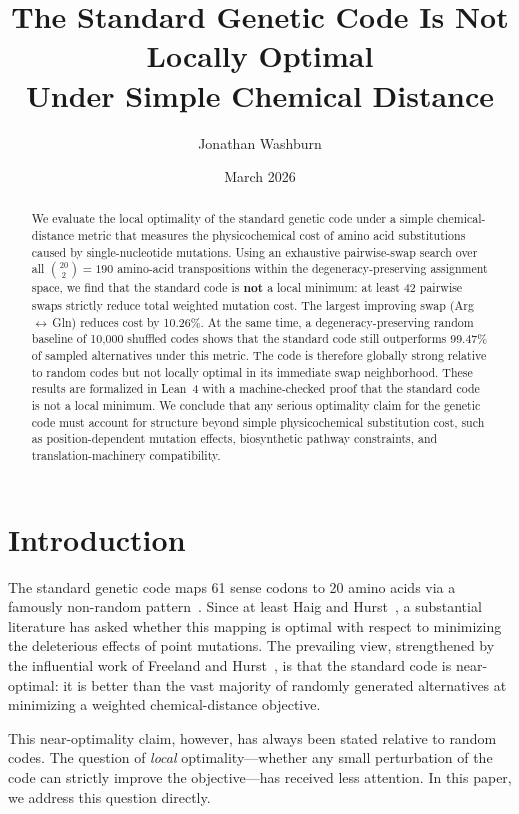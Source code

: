 \documentclass[11pt,twocolumn]{article}
\title{The Standard Genetic Code Is Not Locally Optimal\\Under Simple Chemical Distance}
\author[1]{Jonathan Washburn}
\affil[1]{Independent Researcher}
\date{March 2026}
\begin{document}
\maketitle

\begin{abstract}
We evaluate the local optimality of the standard genetic code under a
simple chemical-distance metric that measures the physicochemical cost of
amino acid substitutions caused by single-nucleotide mutations. Using an
exhaustive pairwise-swap search over all $\binom{20}{2} = 190$ amino-acid
transpositions within the degeneracy-preserving assignment space, we find
that the standard code is \textbf{not} a local minimum: at least 42 pairwise
swaps strictly reduce total weighted mutation cost. The largest improving
swap (Arg\,$\leftrightarrow$\,Gln) reduces cost by 10.26\%. At the same
time, a degeneracy-preserving random baseline of 10,000 shuffled codes shows
that the standard code still outperforms 99.47\% of sampled alternatives
under this metric. The code is therefore globally strong relative to random
codes but not locally optimal in its immediate swap neighborhood. These
results are formalized in Lean~4
with a machine-checked proof that the standard code is not a local minimum.
We conclude
that any serious optimality claim for the genetic code must account for
structure beyond simple physicochemical substitution cost, such as
position-dependent mutation effects, biosynthetic pathway constraints, and
translation-machinery compatibility.
\end{abstract}

\section{Introduction}

The standard genetic code maps 61 sense codons to 20 amino acids via a
famously non-random pattern~\citep{Woese1965, Crick1968}. Since at least
Haig and Hurst~\citep{HaigHurst1991}, a substantial literature has asked
whether this mapping is optimal with respect to minimizing the deleterious
effects of point mutations. The prevailing view, strengthened by the
influential work of Freeland and Hurst~\citep{FreelandHurst1998}, is that
the standard code is near-optimal: it is better than the vast majority of
randomly generated alternatives at minimizing a weighted chemical-distance
objective.

This near-optimality claim, however, has always been stated relative to
random codes. The question of \emph{local} optimality---whether any small
perturbation of the code can strictly improve the objective---has received
less attention. In this paper, we address this question directly.
\end{document}

